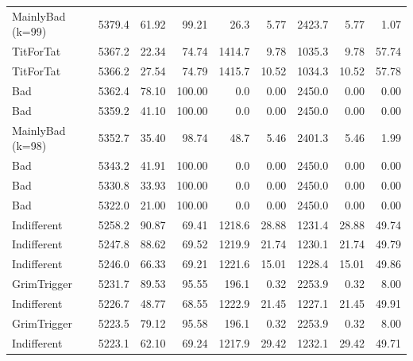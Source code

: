 \documentclass[journal,a4paper,10pt,twoside]{IEEEtran} %
\begin{document}
\begin{table}[ht]
\begin{tabular}{l|rrr|rrrrr}
		MainlyBad (k=99)  & 5379.4 & 61.92 &     99.21 &   26.3 &                   5.77 & 2423.7 &                    5.77 &   1.07 \\
		TitForTat         & 5367.2 & 22.34 &     74.74 & 1414.7 &                   9.78 & 1035.3 &                    9.78 &  57.74 \\
		TitForTat         & 5366.2 & 27.54 &     74.79 & 1415.7 &                  10.52 & 1034.3 &                   10.52 &  57.78 \\
		Bad               & 5362.4 & 78.10 &    100.00 &    0.0 &                   0.00 & 2450.0 &                    0.00 &   0.00 \\
		Bad               & 5359.2 & 41.10 &    100.00 &    0.0 &                   0.00 & 2450.0 &                    0.00 &   0.00 \\
		MainlyBad (k=98)  & 5352.7 & 35.40 &     98.74 &   48.7 &                   5.46 & 2401.3 &                    5.46 &   1.99 \\
		Bad               & 5343.2 & 41.91 &    100.00 &    0.0 &                   0.00 & 2450.0 &                    0.00 &   0.00 \\
		Bad               & 5330.8 & 33.93 &    100.00 &    0.0 &                   0.00 & 2450.0 &                    0.00 &   0.00 \\
		Bad               & 5322.0 & 21.00 &    100.00 &    0.0 &                   0.00 & 2450.0 &                    0.00 &   0.00 \\
		Indifferent       & 5258.2 & 90.87 &     69.41 & 1218.6 &                  28.88 & 1231.4 &                   28.88 &  49.74 \\
		Indifferent       & 5247.8 & 88.62 &     69.52 & 1219.9 &                  21.74 & 1230.1 &                   21.74 &  49.79 \\
		Indifferent       & 5246.0 & 66.33 &     69.21 & 1221.6 &                  15.01 & 1228.4 &                   15.01 &  49.86 \\
		GrimTrigger       & 5231.7 & 89.53 &     95.55 &  196.1 &                   0.32 & 2253.9 &                    0.32 &   8.00 \\
		Indifferent       & 5226.7 & 48.77 &     68.55 & 1222.9 &                  21.45 & 1227.1 &                   21.45 &  49.91 \\
		GrimTrigger       & 5223.5 & 79.12 &     95.58 &  196.1 &                   0.32 & 2253.9 &                    0.32 &   8.00 \\
		Indifferent       & 5223.1 & 62.10 &     69.24 & 1217.9 &                  29.42 & 1232.1 &                   29.42 &  49.71 \\

\end{tabular}
\end{table}
\end{document}
